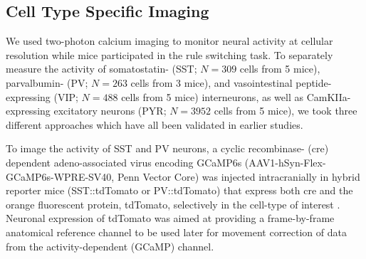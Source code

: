 {%




\subsection*{Cell Type Specific Imaging}
We used two-photon calcium imaging to monitor neural activity at cellular resolution while mice participated in the rule switching task. To separately measure the activity of somatostatin- (SST; $N=309$ cells from 5 mice), parvalbumin- (PV; $N=263$ cells from 3 mice), and vasointestinal peptide-expressing (VIP; $N=488$ cells from 5 mice) interneurons, as well as CamKIIa-expressing excitatory neurons (PYR; $N=3952$ cells from 5 mice), we took three different approaches which have all been validated in earlier studies.

To image the activity of SST and PV neurons, a cyclic recombinase- (cre) dependent adeno-associated virus encoding GCaMP6s (AAV1-hSyn-Flex-GCaMP6s-WPRE-SV40, Penn Vector Core) was injected intracranially in hybrid reporter mice (SST::tdTomato or PV::tdTomato) that express both cre and the orange fluorescent protein, tdTomato, selectively in the cell-type of interest \citep{taniguchi11, ali20}. Neuronal expression of tdTomato was aimed at providing a frame-by-frame anatomical reference channel to be used later for movement correction of data from the activity-dependent (GCaMP) channel. 

}
